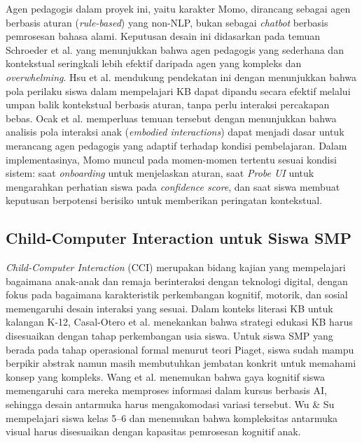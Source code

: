 \documentclass[12pt,a4paper,oneside,openany]{report}
\begin{document}
Agen pedagogis dalam proyek ini, yaitu karakter Momo, dirancang sebagai agen berbasis aturan (\textit{rule-based}) yang non-NLP, bukan sebagai \textit{chatbot} berbasis pemrosesan bahasa alami. Keputusan desain ini didasarkan pada temuan Schroeder et al. \cite{ref9} yang menunjukkan bahwa agen pedagogis yang sederhana dan kontekstual seringkali lebih efektif daripada agen yang kompleks dan \textit{overwhelming}. Hsu et al. \cite{ref15} mendukung pendekatan ini dengan menunjukkan bahwa pola perilaku siswa dalam mempelajari KB dapat dipandu secara efektif melalui umpan balik kontekstual berbasis aturan, tanpa perlu interaksi percakapan bebas. Ocak et al. \cite{ref16} memperluas temuan tersebut dengan menunjukkan bahwa analisis pola interaksi anak (\textit{embodied interactions}) dapat menjadi dasar untuk merancang agen pedagogis yang adaptif terhadap kondisi pembelajaran. Dalam implementasinya, Momo muncul pada momen-momen tertentu sesuai kondisi sistem: saat \textit{onboarding} untuk menjelaskan aturan, saat \textit{Probe UI} untuk mengarahkan perhatian siswa pada \textit{confidence score}, dan saat siswa membuat keputusan berpotensi berisiko untuk memberikan peringatan kontekstual.

\subsection{Child-Computer Interaction untuk Siswa SMP}
\label{subsec:cci-smp}

\textit{Child-Computer Interaction} (CCI) merupakan bidang kajian yang mempelajari bagaimana anak-anak dan remaja berinteraksi dengan teknologi digital, dengan fokus pada bagaimana karakteristik perkembangan kognitif, motorik, dan sosial memengaruhi desain interaksi yang sesuai. Dalam konteks literasi KB untuk kalangan K-12, Casal-Otero et al. \cite{ref2} menekankan bahwa strategi edukasi KB harus disesuaikan dengan tahap perkembangan usia siswa. Untuk siswa SMP yang berada pada tahap operasional formal menurut teori Piaget, siswa sudah mampu berpikir abstrak namun masih membutuhkan jembatan konkrit untuk memahami konsep yang kompleks. Wang et al. \cite{ref19} menemukan bahwa gaya kognitif siswa memengaruhi cara mereka memproses informasi dalam kursus berbasis AI, sehingga desain antarmuka harus mengakomodasi variasi tersebut. Wu \& Su \cite{ref20} mempelajari siswa kelas 5--6 dan menemukan bahwa kompleksitas antarmuka visual harus disesuaikan dengan kapasitas pemrosesan kognitif anak.
\end{document}
